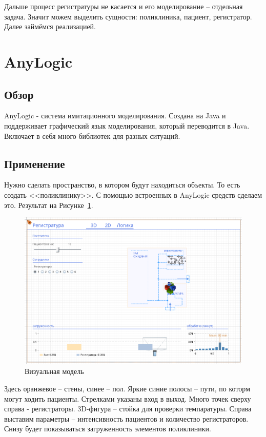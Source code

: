 \documentclass[a4paper, article]{article}
\begin{document}
    Дальше процесс регистратуры не касается и его моделирование -- отдельная задача. Значит можем выделить сущности: поликлиника, пациент, регистратор. Далее займёмся реализацией.

    \pagebreak

    \section{AnyLogic}

    \subsection{Обзор}

    AnyLogic - система имитационного моделирования. Создана на Java и поддерживает графический язык моделирования, который переводится в Java. Включает в себя много библиотек для разных ситуаций.

    \subsection{Применение}

    Нужно сделать пространство, в котором будут находиться объекты. То есть создать <<поликлинику>>. С помощью встроенных в AnyLogic средств сделаем это. Результат на Рисунке~\ref{fig:page2dPlan}.

    \begin{figure}[h]
        \centering
        \includegraphics[width=0.7\linewidth]{page2dPlan.png}
        \caption{\centering Визуальная модель}
        \label{fig:page2dPlan}
    \end{figure}

    Здесь оранжевое -- стены, синее -- пол. Яркие синие полосы -- пути, по которм могут ходить пациенты. Стрелками указаны вход в выход. Много точек сверху справа - регистраторы. 3D-фигура -- стойка для проверки темпаратуры. Справа выставим параметры -- интенсивность пациентов и количество регистраторов. Снизу будет показываться загруженность элементов поликлиники.
\end{document}
